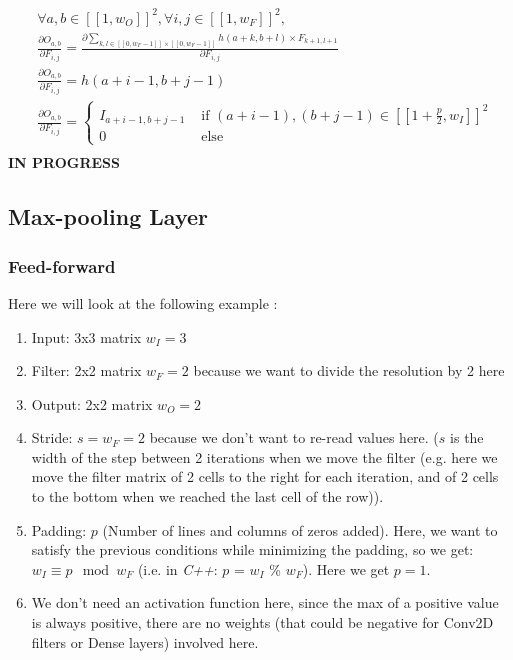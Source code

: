 \documentclass[11pt,a4paper]{report}
\begin{document}
\begin{equation}
\begin{split}
    &\forall a,b \in [\![1,w_O]\!]^2, \forall i,j \in [\![1,w_F]\!]^2,\\
    &\frac{\partial O_{a,b}}{\partial F_{i,j}} = \frac{\partial \sum\limits_{k,l \in [\![0,w_F-1]\!] \times [\![0,w_F-1]\!]} h(a+k,b+l)\times F_{k+1,l+1}}{\partial F_{i,j}} \\
    &\frac{\partial O_{a,b}}{\partial F_{i,j}} = h(a+i-1, b+j-1) \\
    &\frac{\partial O_{a,b}}{\partial F_{i,j}} = \begin{cases}
        I_{a+i-1,b+j-1} &\text{ if } (a+i-1),(b+j-1) \in [\![1+\frac{p}{2},w_I]\!]^2\\
        0 &\text{ else}
    \end{cases} \\
\end{split}
\end{equation}
\textbf{IN PROGRESS}
\\


\newpage
\subsection{Max-pooling Layer}
\subsubsection{Feed-forward}

Here we will look at the following example :
\begin{enumerate}
    \item Input: 3x3 matrix $w_I = 3$
    \item Filter: 2x2 matrix $w_F = 2$ because we want to divide the resolution by 2 here
    \item Output: 2x2 matrix $w_O = 2$
    \item Stride: $s = w_F = 2$ because we don't want to re-read values here. ($s$ is the width of the step between 2 iterations when we move the filter (e.g. here we move the filter matrix of 2 cells to the right for each iteration, and of 2 cells to the bottom when we reached the last cell of the row)).
    \item Padding: $p$ (Number of lines and columns of zeros added). Here, we want to satisfy the previous conditions while minimizing the padding, so we get: $w_I \equiv p \mod{w_F}$ (i.e. in \textit{C++}: $p$ = $w_I$ \% $w_F$).
    Here we get $p = 1$.
    \item We don't need an activation function here, since the max of a positive value is always positive, there are no weights (that could be negative for Conv2D filters or Dense layers) involved here.
\end{enumerate}
\end{document}
